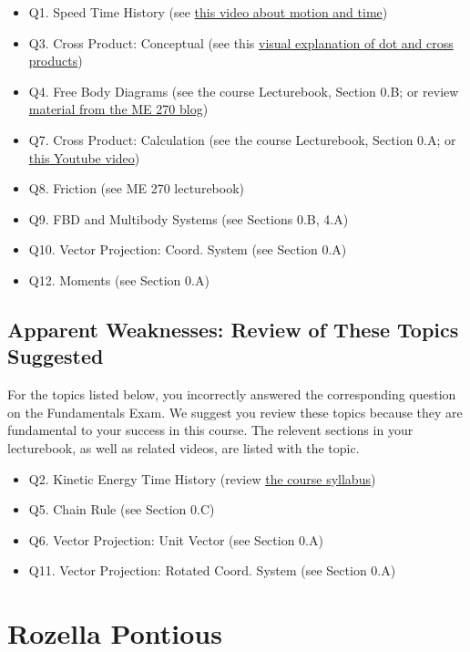 \documentclass[11pt,letterpaper]{article}\usepackage[]{graphicx}\usepackage[]{color}
\begin{document}
\begin{itemize}\item Q1. Speed Time History (see \href{https://www.youtube.com/watch?v=lZPtFDXYQRU}{this video about motion and time})
\item Q3. Cross Product: Conceptual (see this \href{https://www.youtube.com/watch?v=h0NJK4mEIJU&t=8s}{visual explanation of dot and cross products})
\item Q4. Free Body Diagrams (see the course Lecturebook, Section 0.B; or review \href{https://www.purdue.edu/statics/}{material from the ME 270 blog})
\item Q7. Cross Product: Calculation (see the course Lecturebook, Section 0.A; or \href{https://www.youtube.com/watch?v=DmPxjmymM7k}{this Youtube video})
\item Q8. Friction (see ME 270 lecturebook)
\item Q9. FBD and Multibody Systems (see Sections 0.B, 4.A)
\item Q10. Vector Projection: Coord. System (see Section 0.A)
\item Q12. Moments (see Section 0.A)
\end{itemize}\subsection*{Apparent Weaknesses: Review of These Topics Suggested}
For the topics listed below, you incorrectly answered the corresponding question on the Fundamentals Exam.  We suggest you review these topics because they are fundamental to your success in this course.  The relevent sections in your lecturebook, as well as related videos, are listed with the topic.

\begin{itemize}\item Q2. Kinetic Energy Time History (review \href{https://www.purdue.edu/freeform/dynamics/wp-content/uploads/sites/4/2018/01/Syllabus-Spring-2018.pdf}{the course syllabus})
\item Q5. Chain Rule (see Section 0.C)
\item Q6. Vector Projection: Unit Vector (see Section 0.A)
\item Q11. Vector Projection: Rotated Coord. System (see Section 0.A)
\end{itemize}

\pagebreak
\section*{Rozella Pontious}
\end{document}
